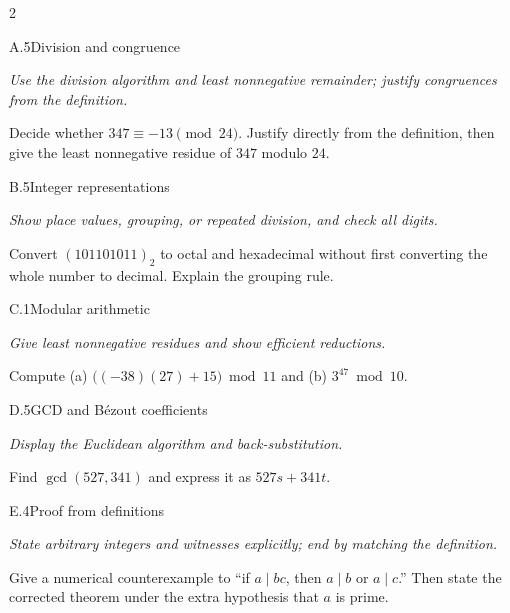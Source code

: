 \documentclass[9pt]{extarticle}
\begin{document}
\begin{multicols}{2}
\begin{CoreProblem}{A.5}{Division and congruence}
{\scriptsize\textit{Use the division algorithm and least nonnegative remainder; justify congruences from the definition.}\par}
Decide whether $347\equiv-13\pmod{24}$. Justify directly from the definition,
then give the least nonnegative residue of $347$ modulo $24$.
\end{CoreProblem}
\begin{CoreProblem}{B.5}{Integer representations}
{\scriptsize\textit{Show place values, grouping, or repeated division, and check all digits.}\par}
Convert $(101101011)_2$ to octal and hexadecimal without first converting the
whole number to decimal. Explain the grouping rule.
\end{CoreProblem}
\begin{CoreProblem}{C.1}{Modular arithmetic}
{\scriptsize\textit{Give least nonnegative residues and show efficient reductions.}\par}
Compute (a) $\bigl((-38)(27)+15\bigr)\bmod11$ and
(b) $3^{47}\bmod10$.
\end{CoreProblem}
\columnbreak
\begin{CoreProblem}{D.5}{GCD and B\'ezout coefficients}
{\scriptsize\textit{Display the Euclidean algorithm and back-substitution.}\par}
Find $\gcd(527,341)$ and express it as $527s+341t$.
\end{CoreProblem}
\begin{CoreProblem}{E.4}{Proof from definitions}
{\scriptsize\textit{State arbitrary integers and witnesses explicitly; end by matching the definition.}\par}
Give a numerical counterexample to ``if $a\mid bc$, then $a\mid b$ or
$a\mid c$.'' Then state the corrected theorem under the extra hypothesis that
$a$ is prime.
\end{CoreProblem}
\end{multicols}
\CoreWorkArea
\FormBreak
{}
\end{document}
